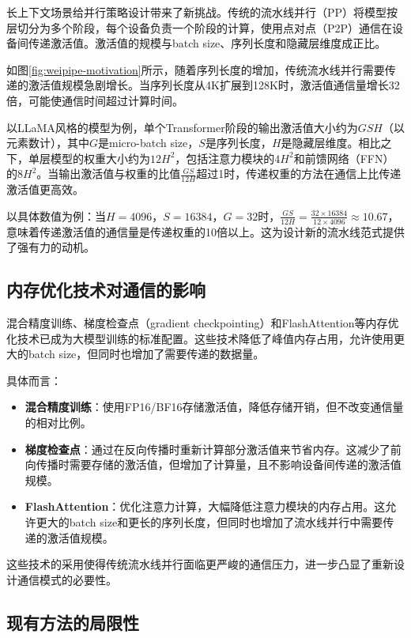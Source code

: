 长上下文场景给并行策略设计带来了新挑战。传统的流水线并行（PP）将模型按层切分为多个阶段，每个设备负责一个阶段的计算，使用点对点（P2P）通信在设备间传递激活值。激活值的规模与batch size、序列长度和隐藏层维度成正比。

如图\ref{fig:weipipe-motivation}所示，随着序列长度的增加，传统流水线并行需要传递的激活值规模急剧增长。当序列长度从4K扩展到128K时，激活值通信量增长32倍，可能使通信时间超过计算时间。

以LLaMA风格的模型为例，单个Transformer阶段的输出激活值大小约为$GSH$（以元素数计），其中$G$是micro-batch size，$S$是序列长度，$H$是隐藏层维度。相比之下，单层模型的权重大小约为$12H^2$，包括注意力模块的$4H^2$和前馈网络（FFN）的$8H^2$。当输出激活值与权重的比值$\frac{GS}{12H}$超过1时，传递权重的方法在通信上比传递激活值更高效。

以具体数值为例：当$H=4096$，$S=16384$，$G=32$时，$\frac{GS}{12H}=\frac{32 \times 16384}{12 \times 4096} \approx 10.67$，意味着传递激活值的通信量是传递权重的10倍以上。这为设计新的流水线范式提供了强有力的动机。

\subsection{内存优化技术对通信的影响}

混合精度训练、梯度检查点（gradient checkpointing）和FlashAttention等内存优化技术已成为大模型训练的标准配置。这些技术降低了峰值内存占用，允许使用更大的batch size，但同时也增加了需要传递的数据量。

具体而言：
\begin{itemize}
    \item \textbf{混合精度训练}：使用FP16/BF16存储激活值，降低存储开销，但不改变通信量的相对比例。
    \item \textbf{梯度检查点}：通过在反向传播时重新计算部分激活值来节省内存。这减少了前向传播时需要存储的激活值，但增加了计算量，且不影响设备间传递的激活值规模。
    \item \textbf{FlashAttention}：优化注意力计算，大幅降低注意力模块的内存占用。这允许更大的batch size和更长的序列长度，但同时也增加了流水线并行中需要传递的激活值规模。
\end{itemize}

这些技术的采用使得传统流水线并行面临更严峻的通信压力，进一步凸显了重新设计通信模式的必要性。

\subsection{现有方法的局限性}


